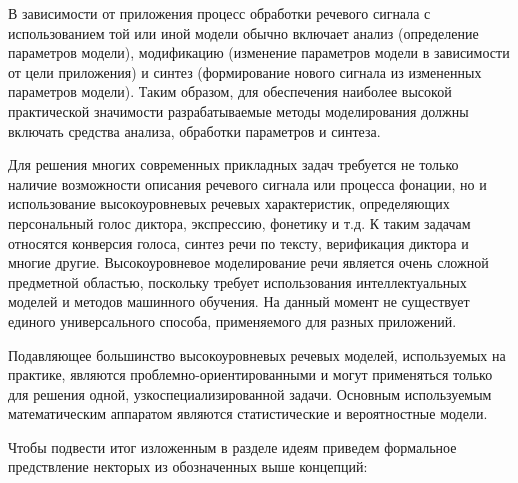 В зависимости от приложения процесс обработки речевого сигнала с использованием той или иной модели обычно включает анализ (определение параметров модели), модификацию (изменение параметров модели в зависимости от цели приложения) и синтез (формирование нового сигнала из измененных параметров модели). Таким образом, для обеспечения наиболее высокой практической значимости разрабатываемые методы моделирования должны включать средства анализа, обработки параметров и синтеза.

Для решения многих современных прикладных задач требуется не только наличие возможности описания речевого сигнала или процесса фонации, но и использование высокоуровневых речевых характеристик, определяющих персональный голос диктора, экспрессию, фонетику и т.д. К таким задачам относятся конверсия голоса, синтез речи по тексту, верификация диктора и многие другие. Высокоуровневое моделирование речи является очень сложной предметной областью, поскольку требует использования интеллектуальных моделей и методов машинного обучения. На данный момент не существует единого универсального способа, применяемого для разных приложений. 

Подавляющее большинство высокоуровневых речевых моделей, используемых на практике, являются проблемно-ориентированными и могут применяться только для решения одной, узкоспециализированной задачи. Основным используемым математическим аппаратом являются статистические и вероятностные модели.

Чтобы подвести итог изложенным в разделе идеям приведем формальное предствление некторых из обозначенных выше концепций:

\begin{SCn}
\begin{scnindent}
\end{scnindent}
\end{SCn}


